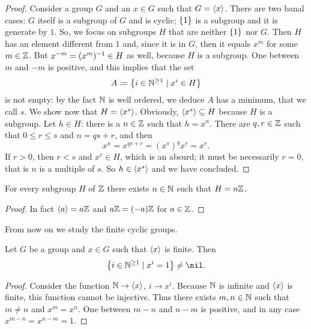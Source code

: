 \begin{proof}
Consider a group \(G\) and an \(x \in G\) such that \(G = \left\langle x\right\rangle\). There are two banal cases: \(G\) itself is a subgroup of \(G\) and is cyclic; \(\left\{1\right\}\) is a subgroup and it is generate by \(1\). So, we focus on subgroups \(H\) that are neither \(\left\{1\right\}\) nor \(G\). Then \(H\) has an element different from \(1\) and, since it is in \(G\), then it equals \(x^m\) for some \(m \in \mathbb Z\). But \(x^{-m} = (x^m)^{-1} \in H\) as well, because \(H\) is a subgroup. One between \(m\) and \(-m\) is positive, and this implies that the set
\[A \coloneq \left\{i \in \mathbb N^{\ge 1} \mid x^i \in H\right\}\]
is not empty: by the fact \(\mathbb N\) is well ordered, we deduce \(A\) has a minimum, that we call \(s\). We show now that \(H = \left\langle x^s\right\rangle\). Obviously, \(\left\langle x^s\right\rangle \subseteq H\) because \(H\) is a subgroup. Let \(h \in H\): there is a \(n \in \mathbb Z\) such that \(h = x^n\). There are \(q, r \in \mathbb Z\) such that \(0 \le r \le s\) and \(n =qs +r\), and then
\[x^n = x^{qs+r} = (x^s)^q x^r = x^r .\]
If \(r > 0\), then \(r < s\) and \(x^r \in H\), which is an absurd; it must be necessarily \(r = 0\), that is \(n\) is a multiple of \(s\). So \(h \in \left\langle x^s\right\rangle\) and we have concluded.
\end{proof}

\begin{corollary}\label{cor:SubgroupsOfZ}
For every subgroup \(H\) of \(\mathbb Z\) there exists \(n \in \mathbb N\) such that \(H = n\mathbb Z\).
\end{corollary}

\begin{proof}
In fact \(\left\langle a\right\rangle = a\mathbb Z\) and \(a \mathbb Z = (-a)\mathbb Z\) for \(a \in \mathbb Z\).
\end{proof}

From now on we study the finite cyclic groups.

\begin{lemma}Let \(G\) be a group and \(x \in G\) such that \(\left\langle x\right\rangle\) is finite. Then
\[\set{i \in \nn^{\ge 1} \mid x^i = 1} \ne \nil.\]
\end{lemma}

\begin{proof}
Consider the function \(\mathbb N \to \left\langle x\right\rangle\), \(i \to x^i\). Because \(\mathbb N\) is infinite and \(\left\langle x\right\rangle\) is finite, this function cannot be injective. Thus there exists \(m, n \in \mathbb N\) such that \(m \ne n\) and \(x^m = x^n\). One between \(m-n\) and \(n-m\) is positive, and in any case \(x^{m-n} = x^{n-m} = 1\). 
\end{proof}


